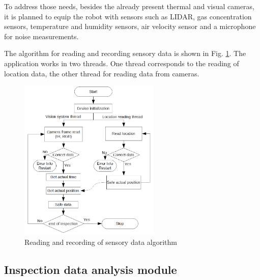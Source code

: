\documentclass[3p,times,12pt]{elsarticle}
\begin{document}
To address those needs, besides the already present thermal and visual cameras, it is planned to equip the robot with sensors such as LIDAR, gas concentration sensors, temperature and humidity sensors, air velocity sensor and a microphone for noise measurements.

The algorithm for reading and recording sensory data is shown in Fig. \ref{fig:Algorytm_cam_loc}. The application works in two threads. One thread corresponds to the reading of location data, the other thread for reading data from cameras.








\begin{figure}[ht!]
	\centering
	\includegraphics[width=0.6\textwidth]{Alg_cam_loc_reader.png}
	\caption{Reading and recording of sensory data algorithm}
	\label{fig:Algorytm_cam_loc}
\end{figure}




\subsection{Inspection data analysis module}
\end{document}
